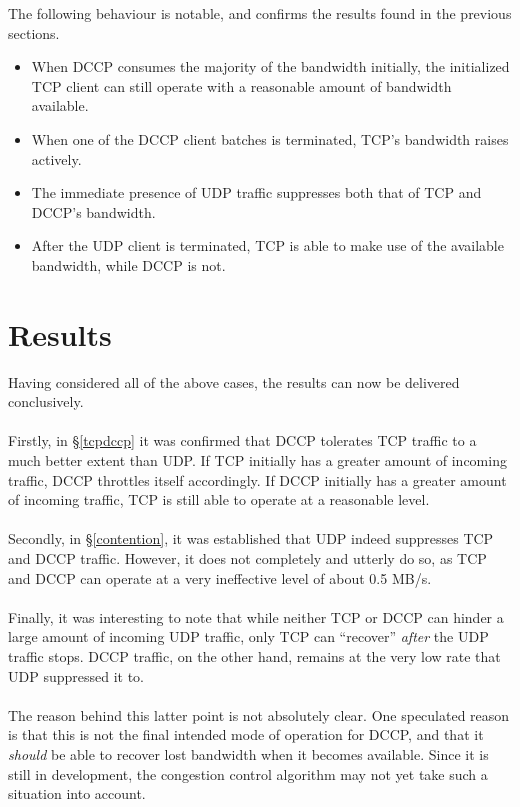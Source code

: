 \documentclass[10pt,a4paper]{article}
\begin{document}
The following behaviour is notable, and confirms the results found in the
previous sections.

\begin{itemize}
 \item When DCCP consumes the majority of the bandwidth initially, the
initialized TCP client can still operate with a reasonable amount of
bandwidth available.
 \item When one of the DCCP client batches is terminated, TCP's bandwidth
raises actively.
 \item The immediate presence of UDP traffic suppresses both that of TCP and
DCCP's bandwidth.
 \item After the UDP client is terminated, TCP is able to make use of the
available bandwidth, while DCCP is not. 
\end{itemize}


\section{Results}

Having considered all of the above cases, the results can now be delivered
conclusively.
\paragraph{}
Firstly, in \S\ref{tcpdccp} it was confirmed that DCCP tolerates TCP traffic to
a
much better extent than UDP. If TCP initially has a greater amount of incoming
traffic, DCCP throttles itself accordingly. If DCCP initially has a greater
amount of incoming traffic, TCP is still able to operate at a reasonable level.
\paragraph{}
Secondly, in \S\ref{contention}, it was established that UDP indeed suppresses
TCP and DCCP traffic. However, it does not completely and utterly do so, as
TCP and DCCP can operate at a very ineffective level of about 0.5 MB/s. 
\paragraph{}
Finally, it was interesting to note that while neither TCP or DCCP can hinder a
large amount of incoming UDP traffic, only TCP can ``recover'' \emph{after} the
UDP traffic stops. DCCP traffic, on the other hand, remains at the very low
rate that UDP suppressed it to.
\paragraph{}
The reason behind this latter point is not absolutely clear. One speculated
reason is that this is not the final intended mode of operation for DCCP, and that it 
\emph{should} be able to recover lost bandwidth when it becomes available. Since it is
still in development, the congestion control algorithm may not yet take such a 
situation into account. 
\end{document}
